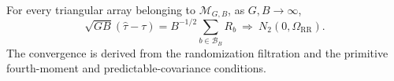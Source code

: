 For every triangular array belonging to \(\mathcal M_{G,B}\), as \(G,B\to\infty\),
\[
\sqrt{GB}(\widehat\tau-\tau)=B^{-1/2}\sum_{b\in\mathcal B_B}R_b\ \Rightarrow\ N_2(0,\Omega_{\mathrm{RR}}).
\]
The convergence is derived from the randomization filtration and the primitive fourth-moment and predictable-covariance conditions.